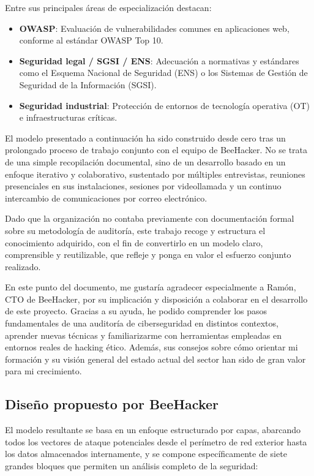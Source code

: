\documentclass[a4paper, 11pt]{article}
\begin{document}
Entre sus principales áreas de especialización destacan:

\begin{itemize}
\item \textbf{OWASP}: Evaluación de vulnerabilidades comunes en aplicaciones web, conforme al estándar OWASP Top 10.
\item \textbf{Seguridad legal / SGSI / ENS}: Adecuación a normativas y estándares como el Esquema Nacional de Seguridad (ENS) o los Sistemas de Gestión de Seguridad de la Información (SGSI).
\item \textbf{Seguridad industrial}: Protección de entornos de tecnología operativa (OT) e infraestructuras críticas.
\end{itemize}

El modelo presentado a continuación ha sido construido desde cero tras un prolongado proceso de trabajo conjunto con el equipo de BeeHacker. No se trata de una simple recopilación documental, sino de un desarrollo basado en un enfoque iterativo y colaborativo, sustentado por múltiples entrevistas, reuniones presenciales en sus instalaciones, sesiones por videollamada y un continuo intercambio de comunicaciones por correo electrónico.

Dado que la organización no contaba previamente con documentación formal sobre su metodología de auditoría, este trabajo recoge y estructura el conocimiento adquirido, con el fin de convertirlo en un modelo claro, comprensible y reutilizable, que refleje y ponga en valor el esfuerzo conjunto realizado.

En este punto del documento, me gustaría agradecer especialmente a Ramón, CTO de BeeHacker, por su implicación y disposición a colaborar en el desarrollo de este proyecto. Gracias a su ayuda, he podido comprender los pasos fundamentales de una auditoría de ciberseguridad en distintos contextos, aprender nuevas técnicas y familiarizarme con herramientas empleadas en entornos reales de hacking ético. Además, sus consejos sobre cómo orientar mi formación y su visión general del estado actual del sector han sido de gran valor para mi crecimiento.

\subsection{Diseño propuesto por BeeHacker}


El modelo resultante se basa en un enfoque estructurado por capas, abarcando todos los vectores de ataque 
potenciales desde el perímetro de red exterior hasta los datos almacenados internamente, y se compone específicamente de siete grandes bloques que permiten un análisis completo de la seguridad:
\end{document}
